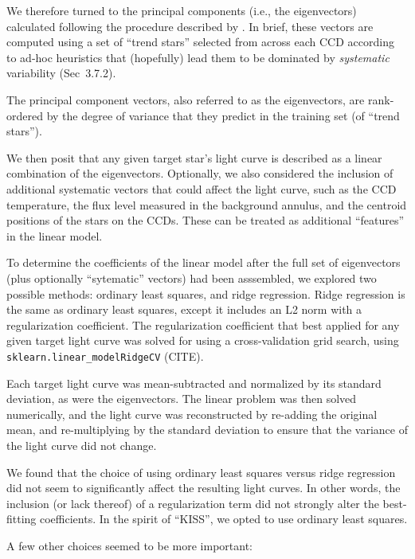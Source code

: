 \documentclass[12pt,twocolumn,tighten]{aastex63}
\begin{document}
We therefore turned to the principal components (i.e., the
eigenvectors) calculated following the procedure described by
\citet{bouma_cdipsI_2019}. In brief, these vectors are computed using
a set of ``trend stars'' selected from across each CCD according to
ad-hoc heuristics that (hopefully) lead them to be dominated by {\it
systematic} variability (Sec~3.7.2).

The principal component vectors, also referred to as the eigenvectors,
are rank-ordered by the degree of variance that they predict in the
training set (of ``trend stars'').

We then posit that any given target star's light curve is described as
a linear combination of the eigenvectors.  Optionally, we also
considered the inclusion of additional systematic vectors that could
affect the light curve, such as the CCD temperature, the flux level
measured in the background annulus, and the centroid positions of the
stars on the CCDs.  These can be treated as additional ``features'' in
the linear model.

To determine the coefficients of the linear
model after the full set of eigenvectors (plus optionally
``sytematic'' vectors) had been asssembled,  we explored two possible
methods: ordinary
least squares, and ridge regression. Ridge regression is the same as
ordinary least squares, except it includes an L2 norm with a regularization
coefficient. The regularization coefficient that best applied for any
given target light curve was solved for using a cross-validation grid
search, using \texttt{sklearn.linear\_modelRidgeCV} (CITE). 

Each target light curve was mean-subtracted and normalized by its
standard deviation, as were the eigenvectors. The linear problem was
then solved numerically, and the light curve was reconstructed by re-adding the
original mean, and re-multiplying by the standard deviation to ensure
that the variance of the light curve did not change.

We found that the choice of using ordinary
least squares versus ridge regression did not seem to significantly
affect the resulting light curves. In other words, the inclusion (or
lack thereof) of a regularization term did not strongly alter the
best-fitting coefficients.
In the spirit of ``KISS'', we opted to use ordinary least squares.

A few other choices seemed to be more important:
\end{document}
